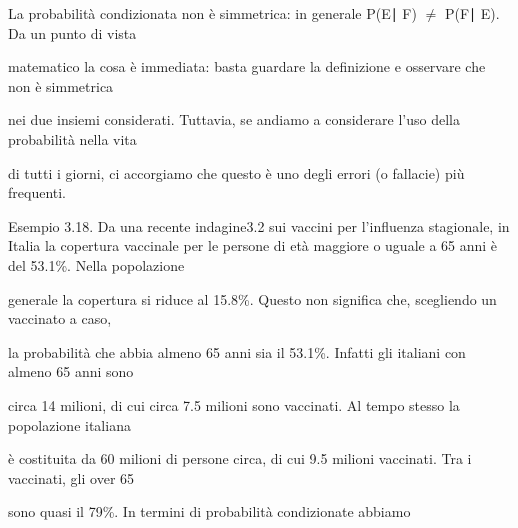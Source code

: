 \documentclass[a4paper,portrait,12pt]{article}
\begin{document}
\begin{flushleft}
La probabilit\`{a} condizionata non \`{e} simmetrica: in generale P(E∣ F) $\neq$ P(F∣ E). Da un punto di vista
\end{flushleft}


\begin{flushleft}
matematico la cosa \`{e} immediata: basta guardare la definizione e osservare che non \`{e} simmetrica
\end{flushleft}


\begin{flushleft}
nei due insiemi considerati. Tuttavia, se andiamo a considerare l'uso della probabilit\`{a} nella vita
\end{flushleft}


\begin{flushleft}
di tutti i giorni, ci accorgiamo che questo \`{e} uno degli errori (o fallacie) più frequenti.
\end{flushleft}


\begin{flushleft}
Esempio 3.18. Da una recente indagine3.2 sui vaccini per l'influenza stagionale, in Italia la copertura vaccinale per le persone di et\`{a} maggiore o uguale a 65 anni \`{e} del 53.1\%. Nella popolazione
\end{flushleft}


\begin{flushleft}
generale la copertura si riduce al 15.8\%. Questo non significa che, scegliendo un vaccinato a caso,
\end{flushleft}


\begin{flushleft}
la probabilit\`{a} che abbia almeno 65 anni sia il 53.1\%. Infatti gli italiani con almeno 65 anni sono
\end{flushleft}


\begin{flushleft}
circa 14 milioni, di cui circa 7.5 milioni sono vaccinati. Al tempo stesso la popolazione italiana
\end{flushleft}


\begin{flushleft}
\`{e} costituita da 60 milioni di persone circa, di cui 9.5 milioni vaccinati. Tra i vaccinati, gli over 65
\end{flushleft}


\begin{flushleft}
sono quasi il 79\%. In termini di probabilit\`{a} condizionate abbiamo
\end{flushleft}
\end{document}
